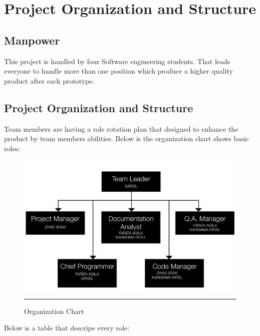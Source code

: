 \chapter{Project Organization and Structure} 

\label{Chapter4} 


\doublespacing


\section{Manpower}
This project is handled by four Software engineering students. That leads everyone to handle more than one position which produce a higher quality product after each prototype.
\pagebreak
\section{Project Organization and Structure}
Team members are having a role rotation plan that designed to enhance the product by team members abilities. Below is the organization chart shows basic roles:
\begin{figure}[H]
	\centering
	\includegraphics[scale=0.5]{Figures/FigureOrganizationChart.png}
	\rule{35em}{0.5pt}
	\caption[Organization Chart]{Organization Chart}
\end{figure}
\pagebreak

Below is a table that descripe every role:

